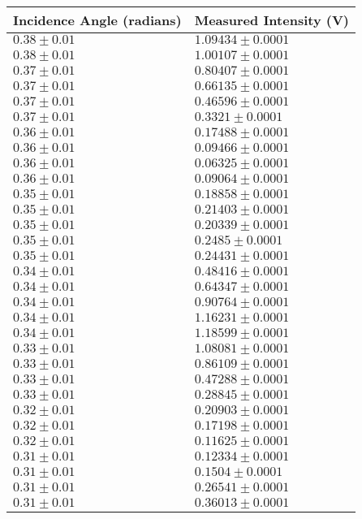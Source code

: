 \begin{tabular}{| p{} | p{} |}
\hline
Incidence Angle (radians) & Measured Intensity (V)\\
\hline
$0.38 \pm 0.01$ & $1.09434 \pm 0.0001$\\
$0.38 \pm 0.01$ & $1.00107 \pm 0.0001$\\
$0.37 \pm 0.01$ & $0.80407 \pm 0.0001$\\
$0.37 \pm 0.01$ & $0.66135 \pm 0.0001$\\
$0.37 \pm 0.01$ & $0.46596 \pm 0.0001$\\
$0.37 \pm 0.01$ & $0.3321 \pm 0.0001$\\
$0.36 \pm 0.01$ & $0.17488 \pm 0.0001$\\
$0.36 \pm 0.01$ & $0.09466 \pm 0.0001$\\
$0.36 \pm 0.01$ & $0.06325 \pm 0.0001$\\
$0.36 \pm 0.01$ & $0.09064 \pm 0.0001$\\
$0.35 \pm 0.01$ & $0.18858 \pm 0.0001$\\
$0.35 \pm 0.01$ & $0.21403 \pm 0.0001$\\
$0.35 \pm 0.01$ & $0.20339 \pm 0.0001$\\
$0.35 \pm 0.01$ & $0.2485 \pm 0.0001$\\
$0.35 \pm 0.01$ & $0.24431 \pm 0.0001$\\
$0.34 \pm 0.01$ & $0.48416 \pm 0.0001$\\
$0.34 \pm 0.01$ & $0.64347 \pm 0.0001$\\
$0.34 \pm 0.01$ & $0.90764 \pm 0.0001$\\
$0.34 \pm 0.01$ & $1.16231 \pm 0.0001$\\
$0.34 \pm 0.01$ & $1.18599 \pm 0.0001$\\
$0.33 \pm 0.01$ & $1.08081 \pm 0.0001$\\
$0.33 \pm 0.01$ & $0.86109 \pm 0.0001$\\
$0.33 \pm 0.01$ & $0.47288 \pm 0.0001$\\
$0.33 \pm 0.01$ & $0.28845 \pm 0.0001$\\
$0.32 \pm 0.01$ & $0.20903 \pm 0.0001$\\
$0.32 \pm 0.01$ & $0.17198 \pm 0.0001$\\
$0.32 \pm 0.01$ & $0.11625 \pm 0.0001$\\
$0.31 \pm 0.01$ & $0.12334 \pm 0.0001$\\
$0.31 \pm 0.01$ & $0.1504 \pm 0.0001$\\
$0.31 \pm 0.01$ & $0.26541 \pm 0.0001$\\
$0.31 \pm 0.01$ & $0.36013 \pm 0.0001$\\
\hline
\end{tabular}\\
